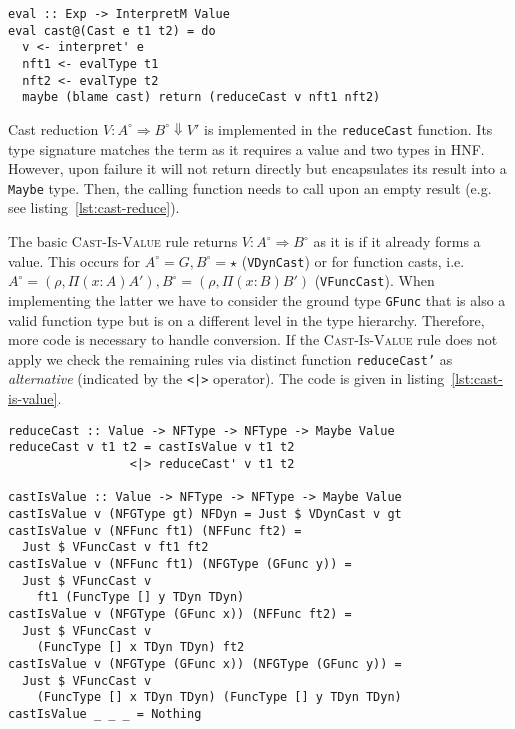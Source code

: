 \begin{lstlisting}[float,
  caption=Cast expression evaluation (\texttt{Interpreter.hs}),
  label=lst:cast-reduce]
eval :: Exp -> InterpretM Value
eval cast@(Cast e t1 t2) = do
  v <- interpret' e
  nft1 <- evalType t1
  nft2 <- evalType t2
  maybe (blame cast) return (reduceCast v nft1 nft2)
\end{lstlisting}

Cast reduction $V : A^\circ \Rightarrow B^\circ \Downarrow V'$ is implemented in the \texttt{reduceCast} function. Its type signature matches the term as it requires a value and two types in HNF. However, upon failure it will not return \blame directly but encapsulates its result into a \texttt{Maybe} type. Then, the calling function needs to call \blame upon an empty result (e.g. see listing~\ref{lst:cast-reduce}).

The basic \textsc{Cast-Is-Value} rule returns $V : A^\circ \Rightarrow B^\circ$ as it is if it already forms a value. This occurs for $A^\circ = G, B^\circ = \star$ (\texttt{VDynCast}) or for function casts, i.e. $A^\circ=(\rho, \Pi(x:A)A'), B^\circ=(\rho, \Pi(x:B)B')$ (\texttt{VFuncCast}). When implementing the latter we have to consider the ground type \texttt{GFunc} that is also a valid function type but is on a different level in the type hierarchy. Therefore, more code is necessary to handle conversion. If the \textsc{Cast-Is-Value} rule does not apply we check the remaining rules via distinct function \texttt{reduceCast'} as \emph{alternative} (indicated by the \texttt{<|>} operator). The code is given in listing~\ref{lst:cast-is-value}.

\begin{lstlisting}[float,
  caption=Rule \textsc{Cast-Is-Value} (\texttt{Interpreter.hs}),
  label=lst:cast-is-value]
reduceCast :: Value -> NFType -> NFType -> Maybe Value
reduceCast v t1 t2 = castIsValue v t1 t2
                 <|> reduceCast' v t1 t2

castIsValue :: Value -> NFType -> NFType -> Maybe Value
castIsValue v (NFGType gt) NFDyn = Just $ VDynCast v gt
castIsValue v (NFFunc ft1) (NFFunc ft2) =
  Just $ VFuncCast v ft1 ft2
castIsValue v (NFFunc ft1) (NFGType (GFunc y)) =
  Just $ VFuncCast v
    ft1 (FuncType [] y TDyn TDyn)
castIsValue v (NFGType (GFunc x)) (NFFunc ft2) =
  Just $ VFuncCast v
    (FuncType [] x TDyn TDyn) ft2
castIsValue v (NFGType (GFunc x)) (NFGType (GFunc y)) =
  Just $ VFuncCast v
    (FuncType [] x TDyn TDyn) (FuncType [] y TDyn TDyn)
castIsValue _ _ _ = Nothing
\end{lstlisting}

